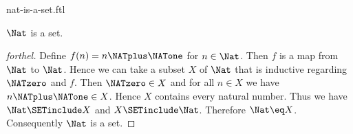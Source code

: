 \documentclass{naproche-library}
\begin{document}
\begin{smodule}[title=The Natural Numbers Form a Set]{nat-is-a-set.ftl}

\begin{proposition}[forthel,id=ARITHMETIC_07_4685510236547454]
  $\Nat$ is a set.
\end{proposition}
\begin{proof}[forthel]
  Define $f(n) = n \NATplus \NATone$ for $n \in \Nat$.
  Then $f$ is a map from $\Nat$ to $\Nat$.
  Hence we can take a subset $X$ of $\Nat$ that is inductive regarding
  $\NATzero$ and $f$.
  Then $\NATzero \in X$ and for all $n \in X$ we have $n \NATplus \NATone \in X$.
  Hence $X$ contains every natural number.
  Thus we have $\Nat \SETinclude X$ and $X \SETinclude \Nat$.
  Therefore $\Nat \eq X$.
  Consequently $\Nat$ is a set.
\end{proof}
\end{smodule}
\end{document}
